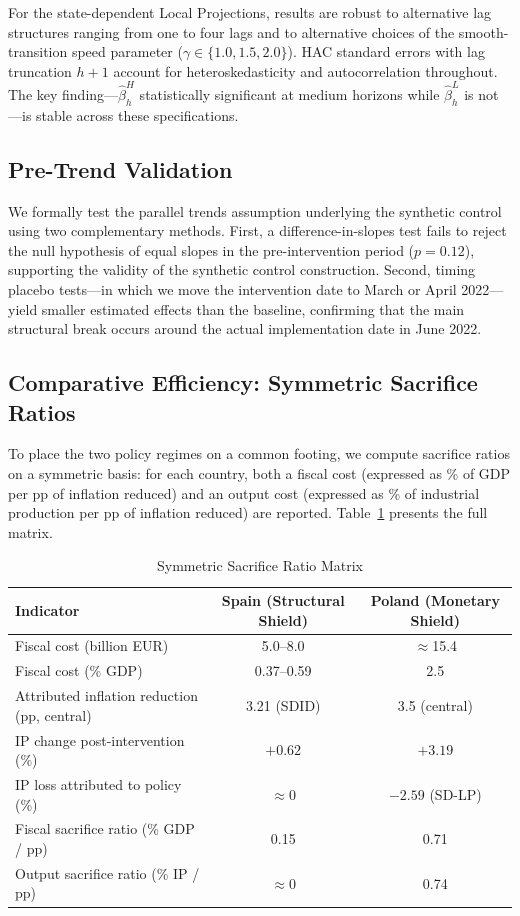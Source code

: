\documentclass[12pt, a4paper]{article}
\begin{document}
For the state-dependent Local Projections, results are robust to alternative lag structures ranging from one to four lags and to alternative choices of the smooth-transition speed parameter ($\gamma \in \{1.0, 1.5, 2.0\}$). HAC standard errors with lag truncation $h+1$ account for heteroskedasticity and autocorrelation throughout. The key finding---$\hat{\beta}^{H}_h$ statistically significant at medium horizons while $\hat{\beta}^{L}_h$ is not---is stable across these specifications.


\subsection{Pre-Trend Validation}

We formally test the parallel trends assumption underlying the synthetic control using two complementary methods. First, a difference-in-slopes test fails to reject the null hypothesis of equal slopes in the pre-intervention period ($p=0.12$), supporting the validity of the synthetic control construction. Second, timing placebo tests---in which we move the intervention date to March or April 2022---yield smaller estimated effects than the baseline, confirming that the main structural break occurs around the actual implementation date in June 2022.


\subsection{Comparative Efficiency: Symmetric Sacrifice Ratios}

To place the two policy regimes on a common footing, we compute sacrifice ratios on a symmetric basis: for each country, both a fiscal cost (expressed as \% of GDP per pp of inflation reduced) and an output cost (expressed as \% of industrial production per pp of inflation reduced) are reported. Table~\ref{tab:sacrifice_matrix} presents the full matrix.

\begin{table}[ht]
\centering
\caption{Symmetric Sacrifice Ratio Matrix}
\label{tab:sacrifice_matrix}
\begin{tabular}{lcc}
\toprule
Indicator & Spain (Structural Shield) & Poland (Monetary Shield) \\
\midrule
Fiscal cost (billion EUR) & 5.0--8.0 & $\approx$15.4 \\
Fiscal cost (\% GDP) & 0.37--0.59 & 2.5 \\
Attributed inflation reduction (pp, central) & 3.21 (SDID) & 3.5 (central) \\
IP change post-intervention (\%) & $+0.62$ & $+3.19$ \\
IP loss attributed to policy (\%) & $\approx 0$ & $-2.59$ (SD-LP) \\
Fiscal sacrifice ratio (\% GDP / pp) & 0.15 & 0.71 \\
Output sacrifice ratio (\% IP / pp) & $\approx 0$ & 0.74 \\
\bottomrule
\end{tabular}
\end{table}
\end{document}
